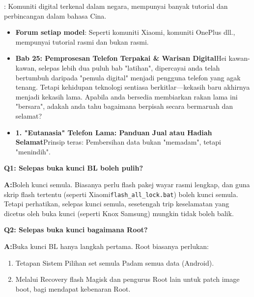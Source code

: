 \begin{tcbinfo}{: Komuniti digital terkenal dalam negara, mempunyai banyak tutorial dan perbincangan dalam bahasa Cina.}
\begin{itemize}
  \item \textbf{Forum setiap model}: Seperti komuniti Xiaomi, komuniti OnePlus dll., mempunyai tutorial rasmi dan bukan rasmi.
  \item \textbf{Bab 25: Pemprosesan Telefon Terpakai \& Warisan Digital}Hei kawan-kawan, selepas lebih dua puluh bab "latihan", dipercayai anda telah bertumbuh daripada "pemula digital" menjadi pengguna telefon yang agak tenang. Tetapi kehidupan teknologi sentiasa berkitlar—kekasih baru akhirnya menjadi kekasih lama. Apabila anda bersedia membiarkan rakan lama ini "bersara", adakah anda tahu bagaimana berpisah secara bermaruah dan selamat?
  \item \textbf{1. "Eutanasia" Telefon Lama: Panduan Jual atau Hadiah Selamat}Prinsip teras: Pembersihan data bukan "memadam", tetapi "menindih".
\end{itemize}

\end{tcbinfo}


\textbf{Q1: Selepas buka kunci BL boleh pulih?}\par

\textbf{A:}Boleh kunci semula. Biasanya perlu flash pakej wayar rasmi lengkap, dan guna skrip flash tertentu (seperti Xiaomi\texttt{flash\_all\_lock.\allowbreak bat}) boleh kunci semula. Tetapi perhatikan, selepas kunci semula, sesetengah trip keselamatan yang dicetus oleh buka kunci (seperti Knox Samsung) mungkin tidak boleh balik.

\textbf{Q2: Selepas buka kunci bagaimana Root?}\par

\textbf{A:}Buka kunci BL hanya langkah pertama. Root biasanya perlukan:

\begin{enumerate}
  \item Tetapan Sistem Pilihan set semula Padam semua data (Android).
  \item Melalui Recovery flash Magisk dan pengurus Root lain untuk patch image boot, bagi mendapat kebenaran Root.
\end{enumerate}
